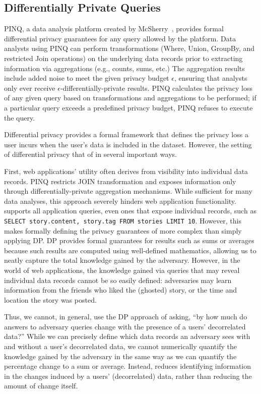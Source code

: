 \subsection{Differentially Private Queries}

PINQ, a data analysis platform created by McSherry~\cite{pinq}, provides formal differential privacy
guarantees for any query allowed by the platform.  Data analysts using PINQ can perform
transformations (Where, Union, GroupBy, and restricted Join operations) on the underlying data
records prior to extracting information via aggregations (e.g., counts, sums, etc.) The aggregation
results include added noise to meet the given privacy budget $\epsilon$, ensuring that analysts only
ever receive $\epsilon$-differentially-private results.  PINQ calculates the privacy loss of any
given query based on transformations and aggregations to be performed; if a particular query exceeds
a predefined privacy budget, PINQ refuses to execute the query.

Differential privacy provides a formal framework that defines the privacy loss a user incurs
when the user's data is included in the dataset. However, the setting of differential privacy
that of \name in several important ways. 

First, web applications' utility often derives from visibility into individual data records. PINQ
restricts JOIN transformation and exposes information only through differentially-private
aggregation mechanisms. While sufficient for many data analyses, this approach severely hinders web
application functionality. \name supports all application queries, even ones that expose individual
records, such as \texttt{SELECT story.content, story.tag FROM stories LIMIT 10}.  
However, this makes formally defining the privacy guarantees of \name more complex than
simply applying DP.  DP provides formal guarantees for results such as sums or averages because such
results are computed using well-defined mathematics, allowing us to neatly capture the total
knowledge gained by the adversary. However, in the world of web applications, the knowledge gained
via queries that may reveal individual data records cannot be so easily defined: adversaries may
learn information from the friends who liked the (ghosted) story, or the time and location the story
was posted.

Thus, we cannot, in general, use the DP approach of asking, ``by how much do answers to adversary
queries change with the presence of a users' decorrelated data?'' While we can precisely define which
data records an adversary sees with and without a user's decorrelated data, we cannot numerically
quantify the knowledge gained by the adversary in the same way as we can quantify the percentage
change to a sum or average.
Instead, \name reduces identifying information in the changes induced by a users' (decorrelated)
data, rather than reducing the amount of change itself.

